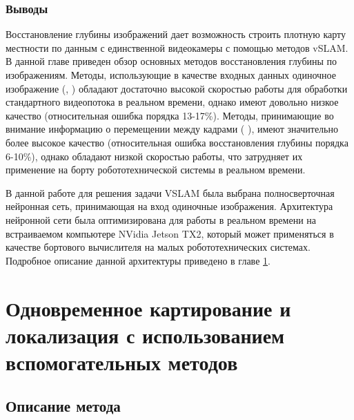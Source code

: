 \documentclass{mipt-thesis-ms}
\begin{document}
	\subsection{Выводы}
	
	Восстановление глубины изображений дает возможность строить плотную карту местности по данным с единственной видеокамеры с помощью методов vSLAM. В данной главе приведен обзор основных методов восстановления глубины по изображениям. Методы, использующие в качестве входных данных одиночное изображение (\cite{laina2016deeper}, \cite{wofk2019fastdepth}) обладают достаточно высокой скоростью работы для обработки стандартного видеопотока в реальном времени, однако имеют довольно низкое качество (относительная ошибка порядка 13-17\%). Методы, принимающие во внимание информацию о перемещении между кадрами (\cite{zhang2019exploiting} \cite{luo2020consistent} \cite{teed2018deepv2d}), имеют значительно более высокое качество (относительная ошибка восстановления глубины порядка 6-10\%), однако обладают низкой скоростью работы, что затрудняет их применение на борту робототехнической системы в реальном времени.
	
	В данной работе для решения задачи VSLAM была выбрана полносверточная нейронная сеть, принимающая на вход одиночные изображения. Архитектура нейронной сети была оптимизирована для работы в реальном времени на встраиваемом компьютере NVidia Jetson TX2, который может применяться в качестве бортового вычислителя на малых робототехнических системах. Подробное описание данной архитектуры приведено в главе \ref{chapter_our_slam}.
	
	
	\chapter{Одновременное картирование и локализация с использованием вспомогательных методов}
	\label{chapter_our_slam}
	
	\section{Описание метода}
	
\end{document}
